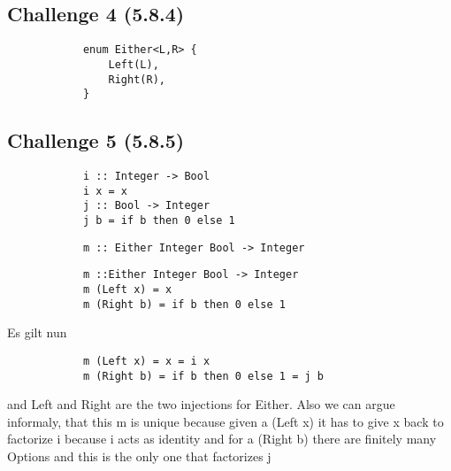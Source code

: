 \documentclass[11pt]{article}
\begin{document}
    \subsection*{Challenge 4 (5.8.4)}
        \begin{verbatim}
            enum Either<L,R> {
                Left(L),
                Right(R),
            }
        \end{verbatim}

    \subsection*{Challenge 5 (5.8.5)}
        \begin{verbatim}
            i :: Integer -> Bool
            i x = x 
            j :: Bool -> Integer 
            j b = if b then 0 else 1
        \end{verbatim}
        \begin{verbatim}
            m :: Either Integer Bool -> Integer
        \end{verbatim}

        \begin{verbatim}
            m ::Either Integer Bool -> Integer
            m (Left x) = x
            m (Right b) = if b then 0 else 1 
        \end{verbatim}
        Es gilt nun 
        \begin{verbatim}
            m (Left x) = x = i x 
            m (Right b) = if b then 0 else 1 = j b
        \end{verbatim}
        and Left and Right are the two injections for Either. 
        Also we can argue informaly, that this m is unique because given a (Left x) it has to give x back to factorize i because i acts as identity and for a (Right b) there are finitely many Options and this is the only one that factorizes j
\end{document}

